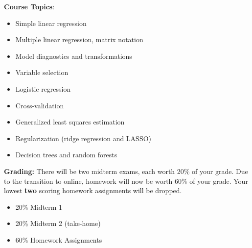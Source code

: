 \documentclass[11pt]{report}
\newenvironment{myitemize}
{ \begin{itemize}
    \setlength{\itemsep}{5pt}
    \setlength{\parskip}{0pt}
    \setlength{\parsep}{0pt}     }
{ \end{itemize}                  }
\begin{document}
\textbf{Course Topics}:
\begin{myitemize}
\item Simple linear regression
\item Multiple linear regression, matrix notation
\item Model diagnostics and transformations
\item Variable selection
\item Logistic regression
\item Cross-validation
\item Generalized least squares estimation
\item Regularization (ridge regression and LASSO)
\item Decision trees and random forests\\
\end{myitemize}

\textbf{Grading:}  There will be two midterm exams, each worth 20\% of your grade.  Due to the transition to online, homework will now be worth 60\% of your grade.  Your lowest \textbf{two} scoring homework assignments will be dropped.  
\begin{myitemize}
\item 20\% Midterm 1
\item 20\% Midterm 2 (take-home)
\item 60\% Homework Assignments\\
\end{myitemize}


\end{document}
